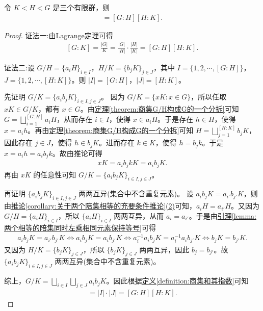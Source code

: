 \documentclass[../../main.tex]{subfiles}
\begin{document}
\begin{proposition}
令 \(K < H < G\) 是三个有限群，则
\begin{align*}
[G : K] = [G : H][H : K] .
\end{align*}
\end{proposition}
\begin{proof}
{\color{blue}证法一:}由\hyperref[theorem:Lagrange定理]{Lagrange定理}可得
\begin{align*}
\left[ G:K \right] =\frac{\left| G \right|}{K}=\frac{\left| G \right|}{\left| H \right|}\cdot \frac{\left| H \right|}{\left| K \right|}=\left[ G:H \right] \left[ H:K \right] .
\end{align*}

{\color{blue}证法二:}设 \(G/H = \{a_iH\}_{i \in I}\)，\(H/K = \{b_jK\}_{j \in J}\)，其中 \(I = \{1, 2, \cdots, [G : H]\}\)，\(J = \{1, 2, \cdots, [H : K]\}\)。则 \(|I| = [G : H]\)，\(|J| = [H : K]\)。

先证明 \(G/K = \{a_ib_jK\}_{i \in I, j \in J}\)。
因为 \(G/K = \{xK : x \in G\}\)，所以任取 \(xK \in G/K\)，都有 \(x \in G\)。由\hyperref[theorem:商集G/H构成G的一个分拆]{定理\ref{theorem:商集G/H构成G的一个分拆}}可知 \(G = \bigsqcup_{i = 1}^{[G : H]} a_iH\)，从而存在 \(i \in I\)，使得 \(x \in a_iH\)。于是存在 \(h \in H\)，使得 \(x = a_ih\)。再由\hyperref[theorem:商集G/H构成G的一个分拆]{定理\ref{theorem:商集G/H构成G的一个分拆}}可知 \(H = \bigsqcup_{j = 1}^{[H : K]} b_jK\)，因此存在 \(j \in J\)，使得 \(h \in b_jK\)。进而存在 \(k \in K\)，使得 \(h = b_jk\)。于是 \(x = a_ih = a_ib_jk\)。故由推论可得
\begin{align*}
xK = a_ib_jkK = a_ib_jK.
\end{align*}
再由 \(xK\) 的任意性可知 \(G/K = \{a_ib_jK\}_{i \in I, j \in J}\)。

再证明 \(\{a_ib_jK\}_{i \in I, j \in J}\) 两两互异(集合中不含重复元素)。
设 \(a_ib_jK = a_{i'}b_{j'}K\)，则由\hyperref[corollary:关于两个陪集相等的充要条件推论]{推论\ref{corollary:关于两个陪集相等的充要条件推论}(2)}可知，\(a_iH = a_{i'}H\)。又因为 \(G/H = \{a_iH\}_{i \in I}\)，所以 \(\{a_iH\}_{i \in I}\) 两两互异，从而 \(a_i = a_{i'}\)。于是由\hyperref[lemma:两个相等的陪集同时左乘相同元素保持等号]{引理\ref{lemma:两个相等的陪集同时左乘相同元素保持等号}}可得
\begin{align*}
a_ib_jK=a_{i\prime}b_{j\prime}K\Leftrightarrow a_ib_jK=a_ib_{j\prime}K\Leftrightarrow a_{i}^{-1}a_ib_jK=a_{i}^{-1}a_ib_{j\prime}K\Leftrightarrow b_jK=b_{j\prime}K.
\end{align*}
又因为 \(H/K = \{b_jK\}_{j \in J}\)，所以 \(\{b_jK\}_{j \in J}\) 两两互异，因此 \(b_j = b_{j'}\)。故 \(\{a_ib_jK\}_{i \in I, j \in J}\) 两两互异(集合中不含重复元素)。

综上，\(G/K = \bigsqcup_{i \in I} \bigsqcup_{j \in J} a_ib_jK\)。因此根据\hyperref[definition:商集和其指数]{定义\ref{definition:商集和其指数}}可知
\begin{align*}
[G : K] = |I| \cdot |J| = [G : H][H : K].
\end{align*} 

\end{proof}
\end{document}
